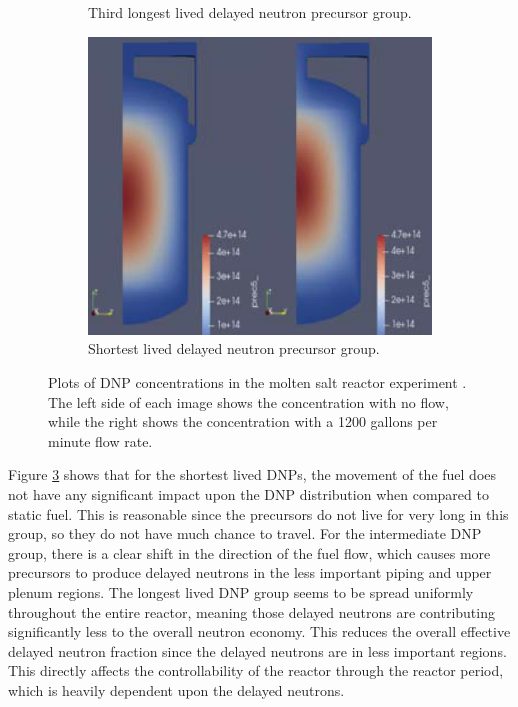 \begin{figure}[H]
\begin{subfigure}{0.4\textwidth}
    \caption{Third longest lived delayed neutron precursor group.}
    \label{fig:second}
\end{subfigure}
\hfill
\centering
\begin{subfigure}{0.4\textwidth}
    \includegraphics[scale=0.25]{images/dnp6.PNG}
    \caption{Shortest lived delayed neutron precursor group.}
    \label{fig:third}
\end{subfigure}

\caption{Plots of DNP concentrations in the molten salt reactor experiment \cite{shi_gen-foam_2021}. The left side of each image shows the concentration with no flow, while the right shows the concentration with a 1200 gallons per minute flow rate.}
\label{fig:genfoam_dnp_locations}
\end{figure}



Figure \ref{fig:genfoam_dnp_locations} shows that for the shortest lived DNPs, the movement of the fuel does not have any significant impact upon the DNP distribution when compared to static fuel. This is reasonable since the precursors do not live for very long in this group, so they do not have much chance to travel. For the intermediate DNP group, there is a clear shift in the direction of the fuel flow, which causes more precursors to produce delayed neutrons in the less important piping  and upper plenum regions. The longest lived DNP group seems to be spread uniformly throughout the entire reactor, meaning those delayed neutrons are contributing significantly less to the overall neutron economy. This reduces the overall effective delayed neutron fraction since the delayed neutrons are in less important regions. This directly affects the controllability of the reactor through the reactor period, which is heavily dependent upon the delayed neutrons.

